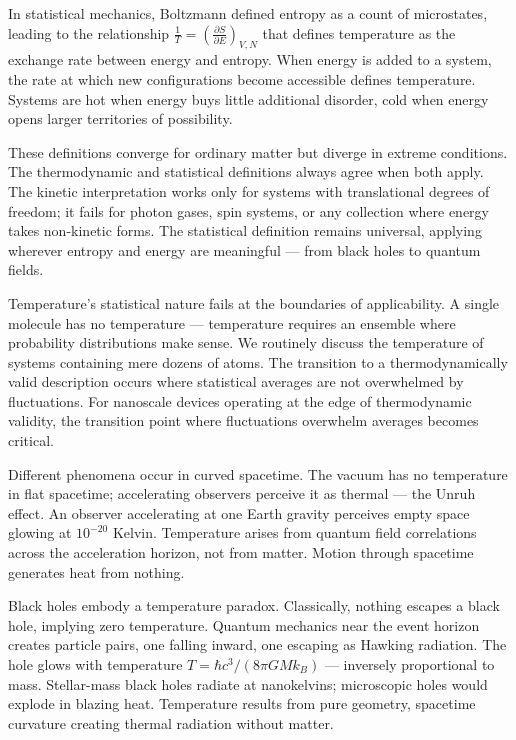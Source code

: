 In statistical mechanics, Boltzmann defined entropy as a count of microstates, leading to the relationship $ \frac{1}{T} = \left( \frac{\partial S}{\partial E} \right)_{V,N} $ that defines temperature as the exchange rate between energy and entropy. When energy is added to a system, the rate at which new configurations become accessible defines temperature. Systems are hot when energy buys little additional disorder, cold when energy opens larger territories of possibility.

These definitions converge for ordinary matter but diverge in extreme conditions. The thermodynamic and statistical definitions always agree when both apply. The kinetic interpretation works only for systems with translational degrees of freedom; it fails for photon gases, spin systems, or any collection where energy takes non-kinetic forms. The statistical definition remains universal, applying wherever entropy and energy are meaningful — from black holes to quantum fields.

Temperature's statistical nature fails at the boundaries of applicability. A single molecule has no temperature — temperature requires an ensemble where probability distributions make sense. We routinely discuss the temperature of systems containing mere dozens of atoms. The transition to a thermodynamically valid description occurs where statistical averages are not overwhelmed by fluctuations. For nanoscale devices operating at the edge of thermodynamic validity, the transition point where fluctuations overwhelm averages becomes critical.

Different phenomena occur in curved spacetime. The vacuum has no temperature in flat spacetime; accelerating observers perceive it as thermal — the Unruh effect. An observer accelerating at one Earth gravity perceives empty space glowing at $10^{-20}$ Kelvin. Temperature arises from quantum field correlations across the acceleration horizon, not from matter. Motion through spacetime generates heat from nothing.

Black holes embody a temperature paradox. Classically, nothing escapes a black hole, implying zero temperature. Quantum mechanics near the event horizon creates particle pairs, one falling inward, one escaping as Hawking radiation. The hole glows with temperature $T = \hbar c^3 / (8\pi G M k_B)$ — inversely proportional to mass. Stellar-mass black holes radiate at nanokelvins; microscopic holes would explode in blazing heat. Temperature results from pure geometry, spacetime curvature creating thermal radiation without matter.

